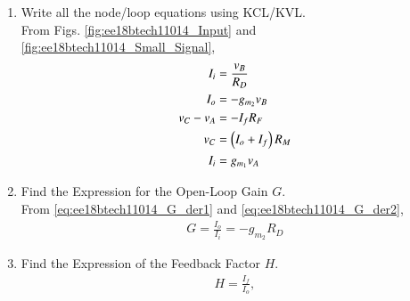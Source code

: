 \begin{enumerate}[label=\thesection.\arabic*.,ref=\thesection.\theenumi]
%
\item Write all the node/loop equations using KCL/KVL.
\\
\solution From Figs. 	\ref{fig:ee18btech11014_Input} and 	\ref{fig:ee18btech11014_Small_Signal},
%
\begin{align}
\label{eq:ee18btech11014_G_der1}
I_i &= \frac{v_B}{R_D}
\\
\label{eq:ee18btech11014_G_der2}
I_o &= -g_{m_2}v_{B}
\\
\label{eq:ee18btech11014_H_der1}
v_{C} - v_{A} &= -I_fR_F
\\
\label{eq:ee18btech11014_H_der2}
v_C &= \left(I_o + I_f\right)R_M
\\
I_i &= g_{m_1}v_{A}
\label{eq:ee18btech11014_vA}
\end{align}
%

\item Find the Expression for the Open-Loop Gain $G$.
\\
\solution From \eqref{eq:ee18btech11014_G_der1} and \eqref{eq:ee18btech11014_G_der2},
%
\begin{align}
\label{eq:ee18btech11014_G}
G=\frac{I_{o}}{I_{i}} = -g_{m_2}R_D
\end{align}

\item Find the Expression of the Feedback Factor $H$.
\\
\solution 
\begin{align}
H = \frac{I_{f}}{I_{o}},
\label{eq:ee18btech11014_Hdef}
\end{align}



\end{enumerate}
